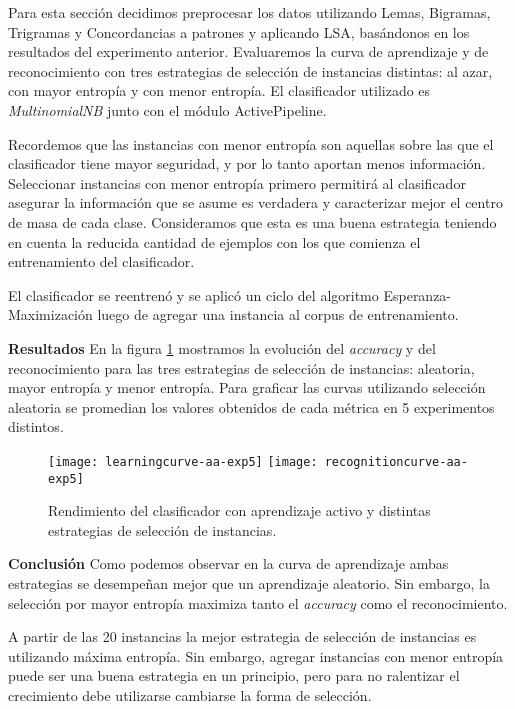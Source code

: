 Para esta sección decidimos preprocesar los datos utilizando Lemas, Bigramas, Trigramas y Concordancias a patrones y aplicando LSA, basándonos en los resultados del experimento anterior. Evaluaremos la curva de aprendizaje y de reconocimiento con tres estrategias de selección de instancias distintas: al azar, con mayor entropía y con menor entropía. El clasificador utilizado es \textit{MultinomialNB} junto con el módulo ActivePipeline.

Recordemos que las instancias con menor entropía son aquellas sobre las que el clasificador tiene mayor seguridad, y por lo tanto aportan menos información. Seleccionar instancias con menor entropía primero permitirá al clasificador asegurar la información que se asume es verdadera y caracterizar mejor el centro de masa de cada clase. Consideramos que esta es una buena estrategia teniendo en cuenta la reducida cantidad de ejemplos con los que comienza el entrenamiento del clasificador.

El clasificador se reentrenó y se aplicó un ciclo del algoritmo Esperanza-Maximización luego de agregar una instancia al corpus de entrenamiento.

\vspace{3 mm}

\textbf{Resultados} En la figura \ref{fig-aa-comparision} mostramos la evolución del \textit{accuracy} y del reconocimiento para las tres estrategias de selección de instancias: aleatoria, mayor entropía y menor entropía. Para graficar las curvas utilizando selección aleatoria se promedian los valores obtenidos de cada métrica en 5 experimentos distintos.

\begin{figure}[h!]
\centering
\texttt{[image: learningcurve-aa-exp5]}
\texttt{[image: recognitioncurve-aa-exp5]}
\caption{Rendimiento del clasificador con aprendizaje activo y distintas estrategias de selección de instancias.}\label{fig-aa-comparision}
\end{figure}

\vspace{3 mm}

\textbf{Conclusión}
Como podemos observar en la curva de aprendizaje ambas estrategias se desempeñan mejor que un aprendizaje aleatorio. Sin embargo, la selección por mayor entropía maximiza tanto el \textit{accuracy} como el reconocimiento.

A partir de las 20 instancias la mejor estrategia de selección de instancias es utilizando máxima entropía. Sin embargo, agregar instancias con menor entropía puede ser una buena estrategia en un principio, pero para no ralentizar el crecimiento debe utilizarse cambiarse la forma de selección.

